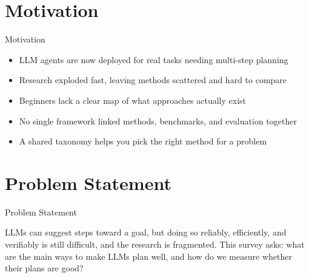 \documentclass[10pt]{beamer}
\begin{document}
\section{Motivation}
\begin{frame}{Motivation}
\begin{itemize}
  \item LLM agents are now deployed for real tasks needing multi-step planning
  \item Research exploded fast, leaving methods scattered and hard to compare
  \item Beginners lack a clear map of what approaches actually exist
  \item No single framework linked methods, benchmarks, and evaluation together
  \item A shared taxonomy helps you pick the right method for a problem
\end{itemize}
\end{frame}
\section{Problem Statement}
\begin{frame}{Problem Statement}
  \begin{block}{}
  LLMs can suggest steps toward a goal, but doing so reliably, efficiently, and verifiably is still difficult, and the research is fragmented. This survey asks: what are the main ways to make LLMs plan well, and how do we measure whether their plans are good?
  \end{block}
\end{frame}
\end{document}
